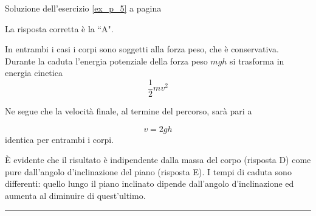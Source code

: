 Soluzione dell'esercizio \ref{ex_p_5} a pagina \pageref{ex_p_5}\label{sol_p_5}

La risposta corretta è la ``A".

In entrambi i casi i corpi sono soggetti alla forza peso, che è conservativa. 
Durante la caduta l’energia potenziale della forza peso $mgh$ si trasforma in energia cinetica
\begin{equation*}
 \frac{1}{2} mv^2
\end{equation*}

Ne segue che la velocità finale, al termine del percorso, sarà pari a 

\begin{equation*}
v = 2 gh
\end{equation*}
identica per entrambi i corpi.


È evidente che il risultato è indipendente dalla massa del corpo (risposta D)
come pure dall’angolo d’inclinazione del piano (risposta E).
I tempi di caduta sono differenti: quello lungo il piano inclinato dipende dall’angolo
d’inclinazione ed aumenta al diminuire di quest’ultimo.



\vspace{1cm}
\hrule
\vspace{1cm}


